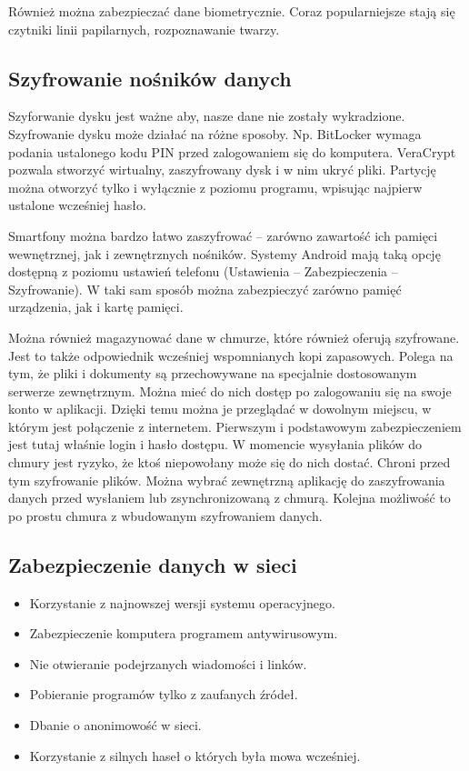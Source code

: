\documentclass[12pt,a4paper]{article}
\begin{document}
Również można zabezpieczać dane biometrycznie. Coraz popularniejsze stają się czytniki linii papilarnych, rozpoznawanie twarzy. 

\subsection{Szyfrowanie nośników danych }
Szyforwanie dysku jest ważne aby, nasze dane nie zostały wykradzione. 
Szyfrowanie dysku może działać na różne sposoby. Np. BitLocker wymaga podania ustalonego kodu PIN przed zalogowaniem się do komputera. VeraCrypt pozwala stworzyć wirtualny, zaszyfrowany dysk i w nim ukryć pliki. Partycję można otworzyć tylko i wyłącznie z poziomu programu, wpisując najpierw ustalone wcześniej hasło. 

Smartfony można bardzo łatwo zaszyfrować – zarówno zawartość ich pamięci wewnętrznej, jak i zewnętrznych nośników. Systemy Android mają taką opcję dostępną z poziomu ustawień telefonu (Ustawienia – Zabezpieczenia – Szyfrowanie). W taki sam sposób można zabezpieczyć zarówno pamięć urządzenia, jak i kartę pamięci. 

Można również magazynować dane w chmurze, które również oferują szyfrowane. Jest to także odpowiednik wcześniej wspomnianych kopi zapasowych. 
 Polega na tym, że pliki i dokumenty są przechowywane na specjalnie dostosowanym serwerze zewnętrznym. Można mieć do nich dostęp po zalogowaniu się na swoje konto w aplikacji. Dzięki temu można je przeglądać w dowolnym miejscu, w którym jest połączenie z internetem. Pierwszym i podstawowym zabezpieczeniem jest tutaj właśnie login i hasło dostępu. 
W momencie wysyłania plików do chmury jest ryzyko, że ktoś niepowołany może się do nich dostać. Chroni przed tym szyfrowanie plików. Można wybrać zewnętrzną aplikację do zaszyfrowania danych przed wysłaniem lub zsynchronizowaną z chmurą. Kolejna możliwość to po prostu chmura z wbudowanym szyfrowaniem danych. 
\subsection{Zabezpieczenie danych w sieci}
\begin{itemize}
 \item Korzystanie z najnowszej wersji systemu operacyjnego. 
 \item Zabezpieczenie komputera programem antywirusowym. 
 \item Nie otwieranie podejrzanych wiadomości i linków. 
 \item Pobieranie programów tylko z zaufanych źródeł. 
 \item Dbanie o anonimowość w sieci. 
 \item Korzystanie z silnych haseł o których była mowa wcześniej. 
\end{itemize}
\end{document}
